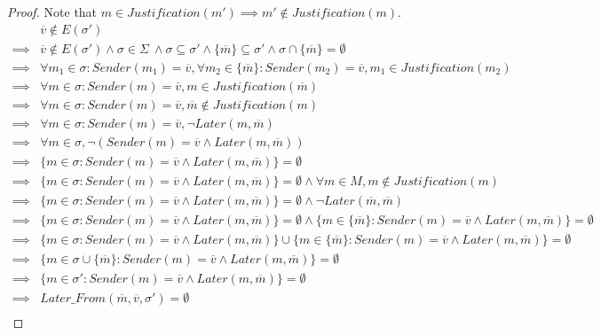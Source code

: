 \begin{proof}
Note that $m \in Justification(m') \implies m' \notin Justification(m)$.
\begin{align}
        &\overline{v} \notin E(\sigma') \\
\implies&\overline{v} \notin E(\sigma') \land \sigma \in \Sigma ~\land \sigma \subseteq \sigma' \land \{\overline{m}\} \subseteq \sigma' \land \sigma \cap \{\overline{m}\} = \emptyset \\
\implies&\forall m_1 \in \sigma: Sender(m_1) = \overline{v}, \forall m_2 \in \{\overline{m}\}: Sender(m_2) = \overline{v}, m_1 \in Justification(m_2) \\
\implies&\forall m \in \sigma: Sender(m) = \overline{v}, m \in Justification(\overline{m}) \\
\implies&\forall m \in \sigma: Sender(m) = \overline{v}, \overline{m} \notin Justification(m) \\
\implies&\forall m \in \sigma: Sender(m) = \overline{v}, \neg Later(m, \overline{m}) \\
\implies&\forall m \in \sigma, \neg (Sender(m) = \overline{v} \land Later(m, \overline{m})) \\
\implies&\{m \in \sigma: Sender(m) = \overline{v} \land Later(m, \overline{m})\} = \emptyset \\
\implies&\{m \in \sigma: Sender(m) = \overline{v} \land Later(m, \overline{m})\} = \emptyset \land \forall m \in M, m \notin Justification(m) \\
\implies&\{m \in \sigma: Sender(m) = \overline{v} \land Later(m, \overline{m})\} = \emptyset \land \neg Later(\overline{m}, \overline{m}) \\
\implies&\{m \in \sigma: Sender(m) = \overline{v} \land Later(m, \overline{m})\} = \emptyset \land \{m \in \{\overline{m}\}: Sender(m) = \overline{v} \land Later(m, \overline{m})\} = \emptyset \\
\implies&\{m \in \sigma: Sender(m) = \overline{v} \land Later(m, \overline{m})\} \cup \{m \in \{\overline{m}\}: Sender(m) = \overline{v} \land Later(m, \overline{m})\} = \emptyset \\
\implies&\{m \in \sigma \cup \{\overline{m}\}: Sender(m) = \overline{v} \land Later(m, \overline{m})\} = \emptyset \\
\implies&\{m \in \sigma': Sender(m) = \overline{v} \land Later(m, \overline{m})\} = \emptyset \\
\implies&Later\_From(\overline{m}, \overline{v}, \sigma') = \emptyset \\
\end{align}

\end{proof}
